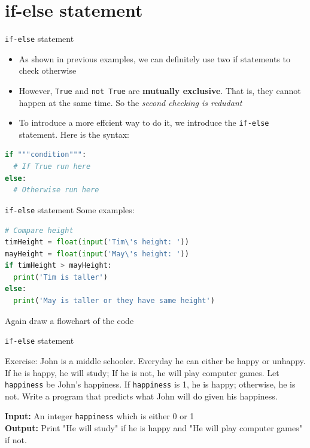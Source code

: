 \documentclass[10pt,xcolor={table,dvipsnames},t]{beamer}
\begin{document}
\section{if-else statement}
\begin{frame}[fragile]{\texttt{if-else} statement}
  \begin{itemize}
    \item As shown in previous examples, we can definitely use two if statements to check otherwise
    \item However, \texttt{True} and \texttt{not True} are \textbf{mutually exclusive}. That is, they cannot happen at the same time. So the \textit{second checking is redudant}
    \item To introduce a more effcient way to do it, we introduce the \texttt{if-else} statement. Here is the syntax:
  \end{itemize}
\begin{lstlisting}[language=python]
if """condition""":
  # If True run here
else:
  # Otherwise run here
\end{lstlisting}
\end{frame}
\begin{frame}[fragile]{\texttt{if-else} statement}
Some examples:
\begin{lstlisting}[language=python]
# Compare height
timHeight = float(input('Tim\'s height: '))
mayHeight = float(input('May\'s height: '))
if timHeight > mayHeight:
  print('Tim is taller')
else:
  print('May is taller or they have same height')
\end{lstlisting}
Again draw a flowchart of the code
\end{frame}
\begin{frame}{\texttt{if-else} statement}
  \begin{exampleblock}{Exercise:}
    John is a middle schooler. Everyday he can either be happy or unhappy. If he is happy, he will study; If he is not, he will play computer games. Let \texttt{happiness} be John's happiness. If \texttt{happiness} is 1, he is happy; otherwise, he is not. Write a program that predicts what John will do given his happiness.
  \end{exampleblock}
  \vspace{1mm}
  \textbf{Input:} An integer \texttt{happiness} which is either 0 or 1\\
  \textbf{Output:} Print "He will study" if he is happy and "He will play computer games" if not.
\end{frame}
\end{document}
